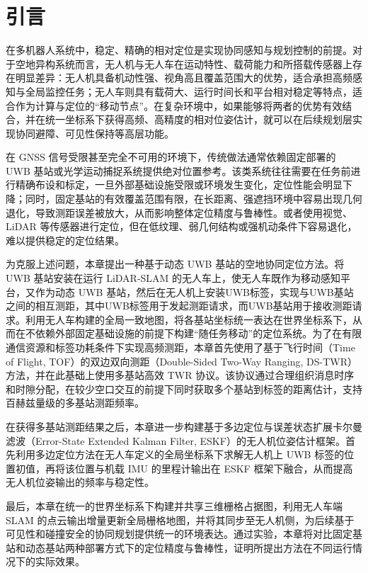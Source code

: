 \section{引言}

在多机器人系统中，稳定、精确的相对定位是实现协同感知与规划控制的前提。对于空地异构系统而言，无人机与无人车在运动特性、载荷能力和所搭载传感器上存在明显差异：无人机具备机动性强、视角高且覆盖范围大的优势，适合承担高频感知与全局监控任务；无人车则具有载荷大、运行时间长和平台相对稳定等特点，适合作为计算与定位的“移动节点”。在复杂环境中，如果能够将两者的优势有效结合，并在统一坐标系下获得高频、高精度的相对位姿估计，就可以在后续规划层实现协同避障、可见性保持等高层功能。

在 GNSS 信号受限甚至完全不可用的环境下，传统做法通常依赖固定部署的 UWB 基站或光学运动捕捉系统提供绝对位置参考。该类系统往往需要在任务前进行精确布设和标定，一旦外部基础设施受限或环境发生变化，定位性能会明显下降；同时，固定基站的有效覆盖范围有限，在长距离、强遮挡环境中容易出现几何退化，导致测距误差被放大，从而影响整体定位精度与鲁棒性。或者使用视觉、LiDAR 等传感器进行定位，但在低纹理、弱几何结构或强机动条件下容易退化，难以提供稳定的定位结果。

为克服上述问题，本章提出一种基于动态 UWB 基站的空地协同定位方法。将 UWB 基站安装在运行 LiDAR-SLAM 的无人车上，使无人车既作为移动感知平台，又作为动态 UWB 基站，然后在无人机上安装UWB标签，实现与UWB基站之间的相互测距，其中UWB标签用于发起测距请求，而UWB基站用于接收测距请求。利用无人车构建的全局一致地图，将各基站坐标统一表达在世界坐标系下，从而在不依赖外部固定基础设施的前提下构建“随任务移动”的定位系统。为了在有限通信资源和标签功耗条件下实现高频测距，本章首先使用了基于飞行时间（Time of Flight, TOF）的双边双向测距（Double-Sided Two-Way Ranging, DS-TWR）方法，并在此基础上使用多基站高效 TWR 协议。该协议通过合理组织消息时序和时隙分配，在较少空口交互的前提下同时获取多个基站到标签的距离估计，支持百赫兹量级的多基站测距频率。

在获得多基站测距结果之后，本章进一步构建基于多边定位与误差状态扩展卡尔曼滤波（Error-State Extended Kalman Filter, ESKF）的无人机位姿估计框架。首先利用多边定位方法在无人车定义的全局坐标系下求解无人机上 UWB 标签的位置初值，再将该位置与机载 IMU 的里程计输出在 ESKF 框架下融合，从而提高无人机位姿输出的频率与稳定性。

最后，本章在统一的世界坐标系下构建并共享三维栅格占据图，利用无人车端 SLAM 的点云输出增量更新全局栅格地图，并将其同步至无人机侧，为后续基于可见性和碰撞安全的协同规划提供统一的环境表达。通过实验，本章将对比固定基站和动态基站两种部署方式下的定位精度与鲁棒性，证明所提出方法在不同运行情况下的实际效果。

